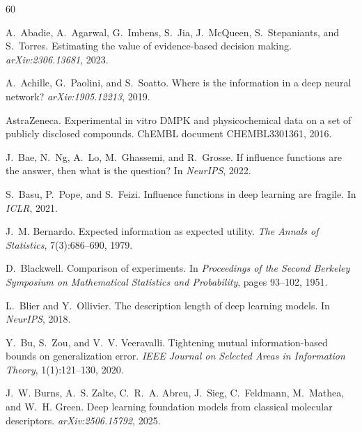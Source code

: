 \documentclass[10pt,twocolumn,letterpaper]{article}
\theoremstyle{definition}
\begin{document}
\begingroup
\small
\setlength{\bibsep}{2pt}
\begin{thebibliography}{60}

A.~Abadie, A.~Agarwal, G.~Imbens, S.~Jia, J.~McQueen, S.~Stepaniants, and S.~Torres.
\newblock Estimating the value of evidence-based decision making.
\newblock \emph{arXiv:2306.13681}, 2023.

A.~Achille, G.~Paolini, and S.~Soatto.
\newblock Where is the information in a deep neural network?
\newblock \emph{arXiv:1905.12213}, 2019.

AstraZeneca.
\newblock Experimental in vitro {DMPK} and physicochemical data on a set of publicly disclosed compounds.
\newblock ChEMBL document CHEMBL3301361, 2016.

J.~Bae, N.~Ng, A.~Lo, M.~Ghassemi, and R.~Grosse.
\newblock If influence functions are the answer, then what is the question?
\newblock In \emph{NeurIPS}, 2022.

S.~Basu, P.~Pope, and S.~Feizi.
\newblock Influence functions in deep learning are fragile.
\newblock In \emph{ICLR}, 2021.

J.~M. Bernardo.
\newblock Expected information as expected utility.
\newblock \emph{The Annals of Statistics}, 7(3):686--690, 1979.

D.~Blackwell.
\newblock Comparison of experiments.
\newblock In \emph{Proceedings of the Second Berkeley Symposium on Mathematical Statistics and Probability}, pages 93--102, 1951.

L.~Blier and Y.~Ollivier.
\newblock The description length of deep learning models.
\newblock In \emph{NeurIPS}, 2018.

Y.~Bu, S.~Zou, and V.~V. Veeravalli.
\newblock Tightening mutual information-based bounds on generalization error.
\newblock \emph{IEEE Journal on Selected Areas in Information Theory}, 1(1):121--130, 2020.

J.~W. Burns, A.~S. Zalte, C.~R.~A. Abreu, J.~Sieg, C.~Feldmann, M.~Mathea, and W.~H. Green.
\newblock Deep learning foundation models from classical molecular descriptors.
\newblock \emph{arXiv:2506.15792}, 2025.


\end{thebibliography}
\end{document}
